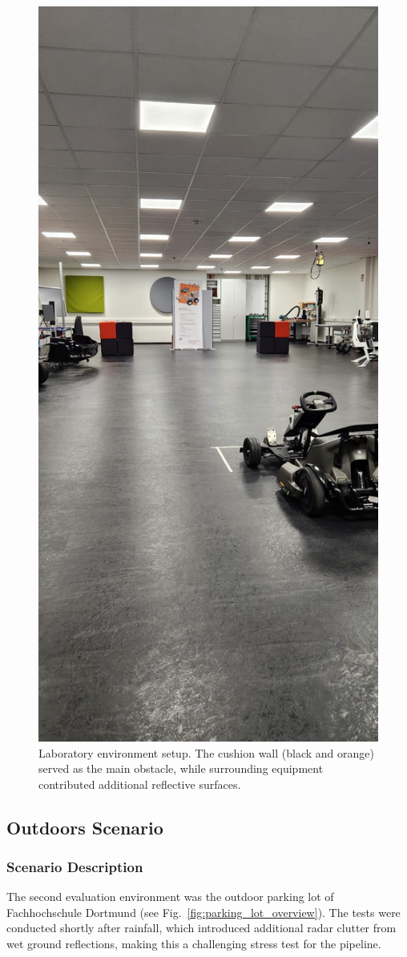 \begin{figure}[!htbp]
    \centering
    \includegraphics[width=0.75\linewidth]{images/labSetup.png}
    \caption{Laboratory environment setup. The cushion wall (black and orange) served as the main obstacle, while surrounding equipment contributed additional reflective surfaces.}
    \label{fig:lab_setup}
\end{figure}

\subsection{Outdoors Scenario}
\subsubsection{Scenario Description}
The second evaluation environment was the outdoor parking lot of Fachhochschule Dortmund (see Fig.~\ref{fig:parking_lot_overview}).  
The tests were conducted shortly after rainfall, which introduced additional radar clutter from wet ground reflections, making this a challenging stress test for the pipeline.  

